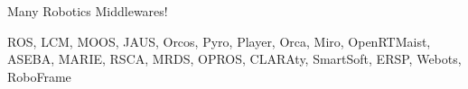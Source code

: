 \documentclass[aspectratio=43]{beamer}
\begin{document}
\begin{frame}{Many Robotics Middlewares!}


{\Small ROS, LCM, MOOS, JAUS, Orcos, Pyro, Player, Orca, Miro, OpenRTMaist, ASEBA, MARIE, RSCA, MRDS, OPROS, CLARAty, SmartSoft, ERSP, Webots, RoboFrame}

\end{frame}
 
\end{document}
